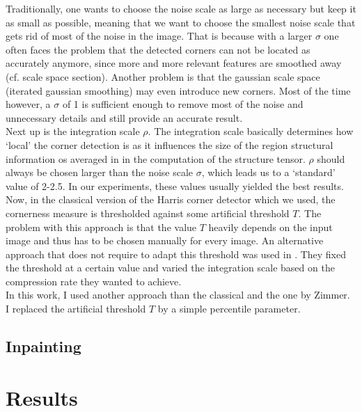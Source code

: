 Traditionally, one wants to choose the noise scale as large as necessary but keep it as small as
possible, meaning that we want to choose the smallest noise scale that gets rid of most of the
noise in the image. That is because with a larger $\sigma$ 
one often faces the problem that the detected corners can not be located as accurately anymore,
since more and more relevant features are smoothed away (cf. scale space section). Another problem
is that the gaussian scale space (iterated gaussian smoothing) may even introduce new corners.
 Most of the time however, a $\sigma$ of 1 is sufficient enough to remove most of the noise and unnecessary
 details and still provide an accurate result.\\
Next up is the integration scale $\rho$. The integration scale basically determines how `local' 
the corner detection is as it influences the size of the region structural information os averaged
in in the computation of the structure tensor. $\rho$ should always be chosen larger than the noise
scale $\sigma$, which leads us to a `standard' value of 2-2.5. In our experiments, these values
usually yielded the best results.\\
Now, in the classical version of the Harris corner detector which we used, the cornerness measure
is thresholded against some artificial threshold $T$. The problem with this approach is that the
value $T$ heavily depends on the input image and thus has to be chosen manually for every image. An
alternative approach that does not require to adapt this threshold was used in \cite{zimmer07}.
They fixed the threshold at a certain value and varied the integration scale based on the
compression rate they wanted to achieve.\\
In this work, I used another approach than the classical and the one by Zimmer\cite{zimmer07}.
I replaced the artificial threshold $T$ by a simple percentile parameter. 

\subsection{Inpainting}

\section{Results}

